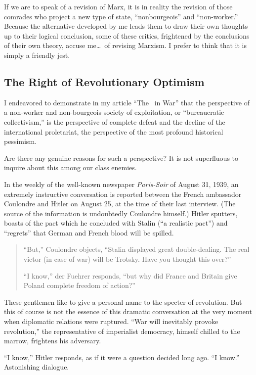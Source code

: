 If we are to speak of a revision of Marx, it is in reality the revision of those comrades who project a new type of state, “nonbourgeois” and “non-worker.” Because the alternative developed by me leads them to draw their own thoughts up to their logical conclusion, some of these critics, frightened by the conclusions of their own theory, accuse me\dots\ of revising Marxism. I prefer to think that it is simply a friendly jest.

\subsection*{The Right of Revolutionary Optimism}

\enlargethispage{1 \baselineskip}

I endeavored to demonstrate in my article ``The \USSR\ in War'' that the perspective of a non-worker and non-bourgeois society of exploitation, or “bureaucratic collectivism,” is the perspective of complete defeat and the decline of the international proletariat, the perspective of the most profound historical pessimism.

Are there any genuine reasons for such a perspective? It is not superfluous to inquire about this among our class enemies.

In the weekly of the well-known newspaper \emph{Paris-Soir} of August 31, 1939, an extremely instructive conversation is reported between the French ambassador Coulondre and Hitler on August 25, at the time of their last interview. (The source of the information is undoubtedly Coulondre himself.) Hitler sputters, boasts of the pact which he concluded with Stalin (“a realistic pact”) and “regrets” that German and French blood will be spilled.
\begin{quote}
  “But,” Coulondre objects, “Stalin displayed great double-dealing. The real victor (in case of war) will be Trotsky. Have you thought this over?”
  
  “I know,” der Fuehrer responds, “but why did France and Britain give Poland complete freedom of action?”
\end{quote}
These gentlemen like to give a personal name to the specter of revolution. But this of course is not the essence of this dramatic conversation at the very moment when diplomatic relations were ruptured. “War will inevitably provoke revolution,” the representative of imperialist democracy, himself chilled to the marrow, frightens his adversary.

“I know,” Hitler responds, as if it were a question decided long ago. “I know.” Astonishing dialogue.

